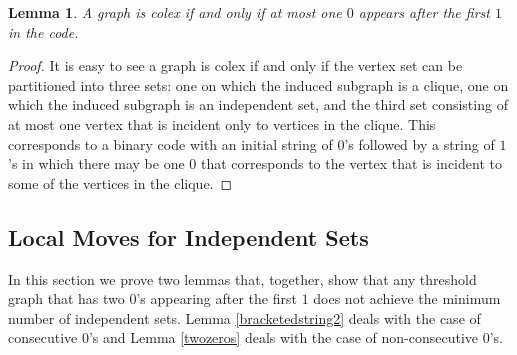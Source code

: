 \documentclass[12pt]{amsart}
\theoremstyle{plain}
\newtheorem{lem}[thm]{Lemma}
\theoremstyle{definition}
\begin{document}
\begin{lem}\label{colex}
A graph is colex if and only if at most one $0$ appears after the first $1$ in the code.
\end{lem}
\begin{proof}
It is easy to see a graph is colex if and only if the vertex set can be partitioned into three sets: one on which the induced subgraph is a clique, one on which the induced subgraph is an independent set, and the third set consisting of at most one vertex that is incident only to vertices in the clique.  This corresponds to a binary code with an initial string of $0$'s followed by a string of $1$'s in which there may be one $0$ that corresponds to the vertex that is incident to some of the vertices in the clique.
\end{proof}
	
	
\subsection{Local Moves for Independent Sets}\label{sec:localmovesindsets}

In this section we prove two lemmas that, together, show that any threshold graph that has two $0$'s appearing after the first $1$ does not achieve the minimum number of independent sets.  Lemma \ref{bracketedstring2} deals with the case of consecutive $0$'s and Lemma \ref{twozeros} deals with the case of non-consecutive $0$'s. 
	
\end{document}
